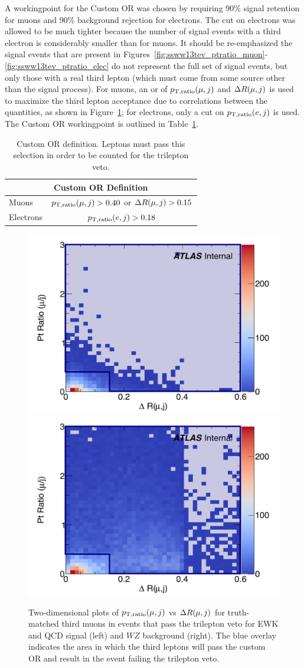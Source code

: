 A workingpoint for the Custom OR was chosen by requiring 90\% signal retention for muons and 90\% background rejection for electrons.
The cut on electrons was allowed to be much tighter because the number of signal events with a third electron is considerably smaller than for muons.
It should be re-emphasized the signal events that are present in Figures~\ref{fig:ssww13tev_ptratio_muon}-\ref{fig:ssww13tev_ptratio_elec} do not represent the full set of signal events, but only those with a real third lepton (which must come from some source other than the signal \ssww process).
For muons, an or of $p_{\textrm{T},\textrm{ratio}}(\mu,j)$ and $\Delta R(\mu,j)$ is used to maximize the third lepton acceptance due to correlations between the quantities, as shown in Figure~\ref{fig:ssww13tev_customor_muon_2d}; for electrons, only a cut on $p_{\textrm{T},\textrm{ratio}}(e,j)$ is used.
The Custom OR workingpoint is outlined in Table~\ref{tab:custom_or_definition}.

\begin{table}[htbp]
  \centering
  \begin{tabular}{l | c}
    \multicolumn{2}{c}{Custom OR Definition} \\
    \hline\hline
    Muons     & $p_{\textrm{T},\textrm{ratio}}(\mu,j) > 0.40$ or $\Delta R(\mu,j) > 0.15$\\
    Electrons & $p_{\textrm{T},\textrm{ratio}}(e,j) > 0.18$ \\
    \hline
  \end{tabular}
  \caption{Custom OR definition.  Leptons must pass this selection in order to be counted for the trilepton veto.}
  \label{tab:custom_or_definition}
\end{table}

\begin{figure}[htbp]
  \centering
  \includegraphics[width=.48\textwidth]{figs/ssww_13tev/custom_or/sig_Muon_DR_PtRatio_edited}
  \includegraphics[width=.48\textwidth]{figs/ssww_13tev/custom_or/bkg_Muon_DR_PtRatio_edited}
  \caption{Two-dimensional plots of $p_{\textrm{T},\textrm{ratio}}(\mu,j)$ vs $\Delta R(\mu,j)$ for truth-matched third muons in events that pass the trilepton veto for EWK and QCD \ssww signal (left) and $WZ$ background (right).  The blue overlay indicates the area in which the third leptons will pass the custom OR and result in the event failing the trilepton veto.}
  \label{fig:ssww13tev_customor_muon_2d}
\end{figure}

